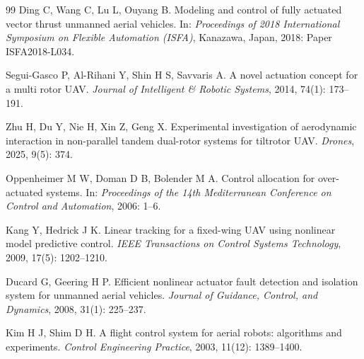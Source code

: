 \documentclass[a4paper,12pt]{ctexart}
\theoremstyle{plain}
\theoremstyle{definition}
\begin{document}
\begin{thebibliography}{99}
Ding C, Wang C, Lu L, Ouyang B.
Modeling and control of fully actuated vector thrust unmanned aerial vehicles.
In: \textit{Proceedings of 2018 International Symposium on Flexible Automation (ISFA)},
Kanazawa, Japan, 2018: Paper ISFA2018-L034.

Segui-Gasco P, Al-Rihani Y, Shin H S, Savvaris A.
A novel actuation concept for a multi rotor UAV.
\textit{Journal of Intelligent \& Robotic Systems}, 2014, 74(1): 173--191.

Zhu H, Du Y, Nie H, Xin Z, Geng X.
Experimental investigation of aerodynamic interaction in non-parallel tandem dual-rotor
systems for tiltrotor UAV.
\textit{Drones}, 2025, 9(5): 374.

Oppenheimer M W, Doman D B, Bolender M A.
Control allocation for over-actuated systems.
In: \textit{Proceedings of the 14th Mediterranean Conference on Control and Automation},
2006: 1--6.

Kang Y, Hedrick J K.
Linear tracking for a fixed-wing UAV using nonlinear model predictive control.
\textit{IEEE Transactions on Control Systems Technology}, 2009, 17(5): 1202--1210.

Ducard G, Geering H P.
Efficient nonlinear actuator fault detection and isolation system for unmanned aerial vehicles.
\textit{Journal of Guidance, Control, and Dynamics}, 2008, 31(1): 225--237.

Kim H J, Shim D H.
A flight control system for aerial robots: algorithms and experiments.
\textit{Control Engineering Practice}, 2003, 11(12): 1389--1400.

\end{thebibliography}
\end{document}
